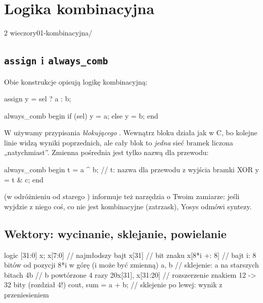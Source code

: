 \chapter{Logika kombinacyjna}
\label{ch:komb}

{2 wieczory}{01-kombinacyjna/}

\section{\texttt{assign} i \texttt{always\_comb}}

Obie konstrukcje opisują logikę kombinacyjną:

\begin{sv}
assign y = sel ? a : b;

always_comb begin
  if (sel) y = a;
  else     y = b;
end
\end{sv}

W  używamy przypisania \emph{blokującego} \code{=}. Wewnątrz
bloku działa jak w C, bo kolejne linie widzą wyniki poprzednich, ale cały blok to
\emph{jedna} sieć bramek liczona „natychmiast”. Zmienna pośrednia jest tylko nazwą
dla przewodu:

\begin{sv}
always_comb begin
  t = a ^ b;        // t: nazwa dla przewodu z wyjścia bramki XOR
  y = t & c;
end
\end{sv}

 (w odróżnieniu od starego ) informuje też
narzędzia o Twoim zamiarze: jeśli wyjdzie z niego coś, co nie jest
kombinacyjne (zatrzask), Yosys odmówi syntezy.

\section{Wektory: wycinanie, sklejanie, powielanie}

\begin{sv}
logic [31:0] x;
x[7:0]                    // najmłodszy bajt
x[31]                     // bit znaku
x[8*i +: 8]               // bajt i: 8 bitów od pozycji 8*i w górę (i może być zmienną)
{a, b}                    // sklejenie: a na starszych bitach
{4{b}}                    // b powtórzone 4 razy
{{20{x[31]}}, x[31:20]}   // rozszerzenie znakiem 12 -> 32 bity (rozdział 4!)
{cout, sum} = a + b;      // sklejenie po lewej: wynik z przeniesieniem
\end{sv}

